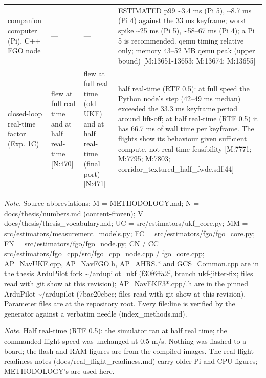 \begin{table}[htbp]
\begin{tabular}{p{}p{}p{}p{}}
companion computer (Pi), C++ FGO node & --- & --- & ESTIMATED p99 \textasciitilde{}3.4 ms (Pi 5), \textasciitilde{}8.7 ms (Pi 4) against the 33 ms keyframe; worst spike \textasciitilde{}25 ms (Pi 5), \textasciitilde{}58--67 ms (Pi 4); a Pi 5 is recommended. qemu timing relative only; memory 43--52 MB qemu peak (upper bound) [M:13651-13653; M:13674; M:13655] \\
closed-loop real-time factor (Exp. 1C) & flew at full real time and at half real-time [N:470] & flew at full real time (old UKF) and at half real-time (final port) [N:471] & half real-time (RTF 0.5): at full speed the Python node's step (42--49 ms median) exceeded the 33.3 ms keyframe period around lift-off; at half real-time (RTF 0.5) it has 66.7 ms of wall time per keyframe. The flights show its behaviour given sufficient compute, not real-time feasibility [M:7771; M:7795; M:7803; corridor\_textured\_half\_fwdc.sdf:44] \\
\bottomrule
\end{tabular}
\par\smallskip\raggedright
\textit{Note.} Source abbreviations: M = METHODOLOGY.md; N = docs/thesis/numbers.md (content-frozen); V = docs/thesis/thesis\_vocabulary.md; UC = src/estimators/ukf\_core.py; MM = src/estimators/measurement\_models.py; FC = src/estimators/fgo/fgo\_core.py; FN = src/estimators/fgo/fgo\_node.py; CN / CC = src/estimators/fgo\_cpp/src/fgo\_cpp\_node.cpp / fgo\_core.cpp; AP\_NavUKF.cpp, AP\_NavFGO.h, AP\_AHRS.* and GCS\_Common.cpp are in the thesis ArduPilot fork \textasciitilde{}/ardupilot\_ukf (f30f6ffa2f, branch ukf-jitter-fix; files read with git show at this revision); AP\_NavEKF3*.cpp/.h are in the pinned ArduPilot \textasciitilde{}/ardupilot (7bac20cbcc; files read with git show at this revision). Parameter files are at the repository root. Every file:line is verified by the generator against a verbatim needle (index\_methods.md).\par
\textit{Note.} Half real-time (RTF 0.5): the simulator ran at half real time; the commanded flight speed was unchanged at 0.5 m/s. Nothing was flashed to a board; the flash and RAM figures are from the compiled images. The real-flight readiness notes (docs/real\_flight\_readiness.md) carry older Pi and CPU figures; METHODOLOGY's are used here.\par
\end{table}
